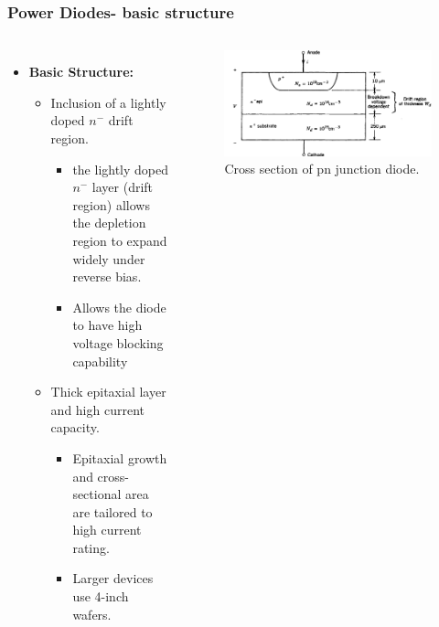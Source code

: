 \begin{frame}
    \frametitle{Power Diodes- basic structure}
    \begin{columns}
        \begin{itemize}
            \item \textbf{Basic Structure:}
            \begin{itemize}
                \item Inclusion of a lightly doped $n^-$ drift region.
                \begin{itemize}
                    \item the lightly doped $n^-$ layer (drift region) allows the depletion region to expand widely under reverse bias.
                    \item Allows the diode to have high voltage blocking capability
                \end{itemize}
                \item Thick epitaxial layer and high current capacity.
                \begin{itemize}
                    \item Epitaxial growth and cross-sectional area are tailored to high current rating.
                    \item Larger devices use 4-inch wafers.
                \end{itemize}
            \end{itemize}
        \end{itemize}

        \begin{figure}
            \centering
            \label{fig:Power_Diodes_structure_and_IV_characteristics}
            \includegraphics[scale=0.2]{fig/lec04/cross_section_pn_junction.png}
            \caption{Cross section of pn junction diode.}
        \end{figure}
    \end{columns}
\end{frame}

